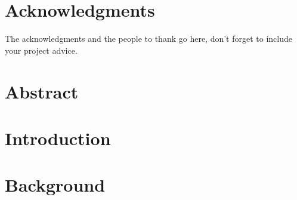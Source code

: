 \documentclass[a4paper,11pt,twoside,openright]{WCarticle}
\begin{document}

\tpage
\pagestyle{plain}

\chapter*{Acknowledgments}
The acknowledgments and the people to thank go here, don't forget to include your project advice. 

\chapter*{Abstract} 


\tableofcontents
\listoffigures
\listoftables
\cleardoublepage
\pagestyle{fancy}

\chapter{Introduction} \label{chap:intro}



\chapter{Background} \label{chap:backgrd}



\iffalse
\chapter{Preliminaries} \label{chap:prelim}


\chapter{Approach} \label{chap:appr}


\chapter{Implementation} \label{chap:impl}


\chapter{Evaluation} \label{chap:eval}



\chapter{Conclusion} \label{chap:conclusion}

\fi

\end{document}
